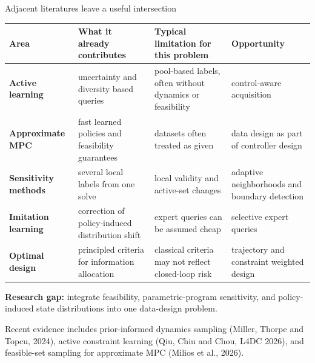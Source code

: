\documentclass[aspectratio=169,10pt]{beamer}
\newcommand{\smallsource}[1]{\vfill\begin{flushleft}\color{Slate}\tiny #1\end{flushleft}}
\begin{document}
\begin{frame}{Adjacent literatures leave a useful intersection}
\scriptsize
\setlength{\tabcolsep}{4pt}
\renewcommand{\arraystretch}{1.35}
\begin{tabular}{>{\bfseries\color{Teal}}p{} p{} p{} p{}}
\toprule
Area & What it already contributes & Typical limitation for this problem & Opportunity \\
\midrule
Active learning & uncertainty and diversity based queries & pool-based labels, often without dynamics or feasibility & control-aware acquisition \\
Approximate MPC & fast learned policies and feasibility guarantees & datasets often treated as given & data design as part of controller design \\
Sensitivity methods & several local labels from one solve & local validity and active-set changes & adaptive neighborhoods and boundary detection \\
Imitation learning & correction of policy-induced distribution shift & expert queries can be assumed cheap & selective expert queries \\
Optimal design & principled criteria for information allocation & classical criteria may not reflect closed-loop risk & trajectory and constraint weighted design \\
\bottomrule
\end{tabular}

\vspace{0.38cm}
\normalsize
\colorbox{PaleGold}{\parbox{0.93\textwidth}{\centering
\textbf{Research gap:} integrate feasibility, parametric-program sensitivity, and policy-induced state distributions into one data-design problem.}}

\smallsource{Recent evidence includes prior-informed dynamics sampling (Miller, Thorpe and Topcu, 2024), active constraint learning (Qiu, Chiu and Chou, L4DC 2026), and feasible-set sampling for approximate MPC (Milios et al., 2026).}
\end{frame}
\end{document}
